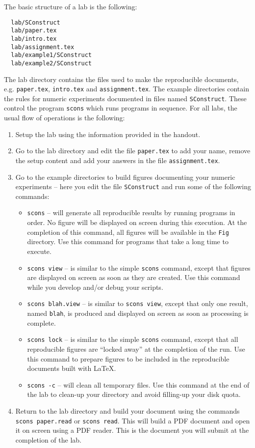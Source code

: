 The basic structure of a lab is the following:
\begin{verbatim}
  lab/SConstruct
  lab/paper.tex
  lab/intro.tex
  lab/assignment.tex
  lab/example1/SConstruct
  lab/example2/SConstruct
\end{verbatim}
The lab directory contains the files used to make the reproducible
documents, e.g. \texttt{paper.tex}, \texttt{intro.tex} and
\texttt{assignment.tex}. The example directories contain the rules for
numeric experiments documented in files named
\texttt{SConstruct}. These control the program \texttt{scons} which
runs \mg programs in sequence. For all labs, the usual flow of
operations is the following:
%
\begin{enumerate}
%
\item Setup the lab using the information provided in the handout.
%
\item Go to the lab directory and edit the file \texttt{paper.tex} to
  add your name, remove the setup content and add your answers in the
  file \texttt{assignment.tex}.
%
\item Go to the example directories to build figures documenting your
  numeric experiments -- here you edit the file \texttt{SConstruct}
  and run some of the following commands:
%
  \begin{itemize} 
  \item \texttt{scons} -- will generate all reproducible results by
    running programs in order. No figure will be displayed on screen
    during this execution. At the completion of this command, all
    figures will be available in the \texttt{Fig} directory. Use this
    command for programs that take a long time to execute.
  \item \texttt{scons view} -- is similar to the simple \texttt{scons}
    command, except that figures are displayed on screen as soon as
    they are created. Use this command while you develop and/or debug
    your scripts.
  \item \texttt{scons blah.view} -- is similar to \texttt{scons view},
    except that only one result, named \texttt{blah}, is produced and
    displayed on screen as soon as processing is complete.
  \item \texttt{scons lock} -- is similar to the simple \texttt{scons}
    command, except that all reproducible figures are ``locked away''
    at the completion of the run. Use this command to prepare figures
    to be included in the reproducible documents built with \LaTeX.
  \item \texttt{scons -c} -- will clean all temporary files. Use this
    command at the end of the lab to clean-up your directory and avoid
    filling-up your disk quota.
  \end{itemize}
%
\item Return to the lab directory and build your document using the
  commands \texttt{scons paper.read} or \texttt{scons read}. This will
  build a PDF document and open it on screen using a PDF reader. This
  is the document you will submit at the completion of the lab.
\end{enumerate}

